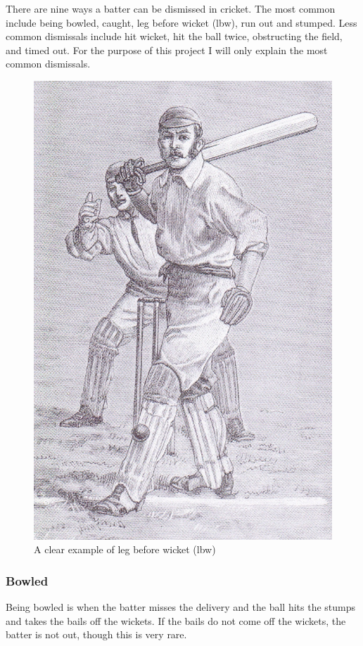 \documentclass[12pt,a4paper]{report}
\theoremstyle{definition}
\begin{document}
There are nine ways a batter can be dismissed in cricket. 
The most common include being bowled, caught, leg before wicket (lbw), run out and stumped. 
Less common dismissals include hit wicket, hit the ball twice, obstructing the field, and timed out. 
For the purpose of this project I will only explain the most common dismissals. 

\begin{figure}[H]
    \centering
    \includegraphics[width=0.8\linewidth]{Leg_before_wicket.jpg}
    \caption{A clear example of leg before wicket (lbw) \citep{lbwWiki}}
    \label{fig:lbw}
\end{figure}

\subsubsection{Bowled}

Being bowled is when the batter misses the delivery and the ball hits the stumps and takes the bails off the wickets.
If the bails do not come off the wickets, the batter is not out, though this is very rare.
\end{document}
